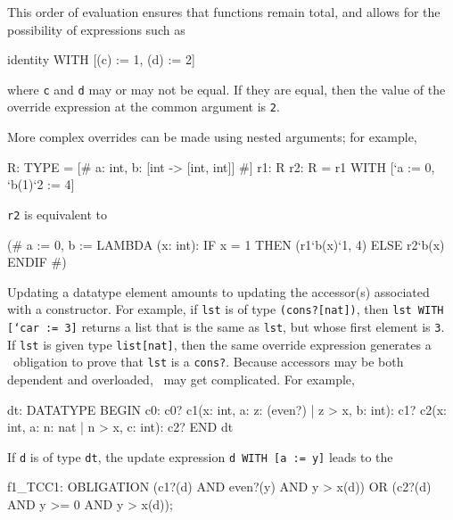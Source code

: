 This order of evaluation ensures that functions remain total, and allows
for the possibility of expressions such as
\begin{pvsex}
  identity WITH [(c) := 1, (d) := 2]
\end{pvsex}
where \texttt{c} and \texttt{d} may or may not be equal.  If they are
equal, then the value of the override expression at the common argument is
\texttt{2}.

More complex overrides can be made using nested arguments; for example,
\begin{pvsex}
  R: TYPE = [# a: int, b: [int -> [int, int]] #]
  r1: R
  r2: R = r1 WITH [`a := 0, `b(1)`2 := 4]
\end{pvsex}
{\tt r2} is equivalent to
\begin{pvsex}
  (# a := 0,
     b := LAMBDA (x: int):
           IF x = 1
           THEN (r1`b(x)`1, 4)
           ELSE r2`b(x)
           ENDIF #)
\end{pvsex}

Updating a datatype element amounts to updating the accessor(s) associated
with a constructor.  For example, if \texttt{lst} is of type
\texttt{(cons?[nat])}, then \texttt{lst WITH [`car := 3]} returns a list
that is the same as \texttt{lst}, but whose first element is \texttt{3}.
If \texttt{lst} is given type \texttt{list[nat]}, then the same override
expression generates a \tcc\ obligation to prove that \texttt{lst} is a
\texttt{cons?}.  Because accessors may be both dependent and overloaded,
\tccs\ may get complicated.  For example,
\begin{pvsex}
  dt: DATATYPE
  BEGIN
   c0: c0?
   c1(x: int, a: \setb{}z: (even?) | z > x\sete, b: int): c1?
   c2(x: int, a: \setb{}n: nat | n > x\sete, c: int): c2?
  END dt
\end{pvsex}
If \texttt{d} is of type \texttt{dt}, the update expression \texttt{d WITH
[a := y]} leads to the \tcc
\begin{pvsex}
  f1_TCC1: OBLIGATION
    (c1?(d) AND even?(y) AND y > x(d)) OR
     (c2?(d) AND y >= 0 AND y > x(d));
\end{pvsex}


